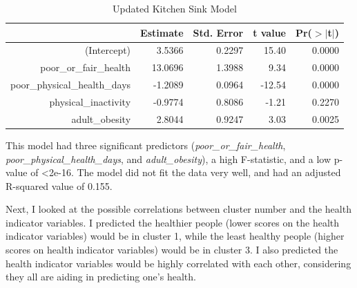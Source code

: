 \documentclass[12pt,twoside]{amherstthesis}
\begin{document}
  \begin{Shaded}
  \begin{Highlighting}[]
  \StringTok{ }\OperatorTok{~}
  \end{Highlighting}
  \end{Shaded}
  
  \begin{table}[ht]
  \centering
  \begin{tabular}{rrrrr}
    \hline
   & Estimate & Std. Error & t value & Pr($>$$|$t$|$) \\ 
    \hline
  (Intercept) & 3.5366 & 0.2297 & 15.40 & 0.0000 \\ 
    poor\_or\_fair\_health & 13.0696 & 1.3988 & 9.34 & 0.0000 \\ 
    poor\_physical\_health\_days & -1.2089 & 0.0964 & -12.54 & 0.0000 \\ 
    physical\_inactivity & -0.9774 & 0.8086 & -1.21 & 0.2270 \\ 
    adult\_obesity & 2.8044 & 0.9247 & 3.03 & 0.0025 \\ 
     \hline
  \end{tabular}
  \caption{Updated Kitchen Sink Model} 
  \end{table}
  
  This model had three significant predictors
  (\emph{poor\_or\_fair\_health}, \emph{poor\_physical\_health\_days}, and
  \emph{adult\_obesity}), a high F-statistic, and a low p-value of
  \textless{}2e-16. The model did not fit the data very well, and had an
  adjusted R-squared value of 0.155.
  
  Next, I looked at the possible correlations between cluster number and
  the health indicator variables. I predicted the healthier people (lower
  scores on the health indicator variables) would be in cluster 1, while
  the least healthy people (higher scores on health indicator variables)
  would be in cluster 3. I also predicted the health indicator variables
  would be highly correlated with each other, considering they all are
  aiding in predicting one's health.
  
  \begin{Shaded}
  \begin{Highlighting}[]
  \end{Highlighting}
  \end{Shaded}
  
\end{document}
